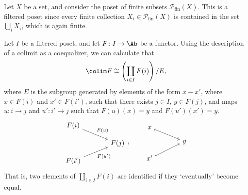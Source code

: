 \documentclass[main.tex]{subfiles}
\begin{document}
\begin{example}
  \label{eg:poset_of_finite_subsets}
  Let $X$ be a set, and consider the poset of finite subsets $\mathcal{P}_{\mathrm{fin}}(X)$. This is a filtered poset since every finite collection $X_{i} \in \mathcal{P}_{\mathrm{fin}}(X)$ is contained in the set $\bigcup_{i} X_{i}$, which is again finite.
\end{example}

Let $I$ be a filtered poset, and let $F\colon I \to \Ab$ be a functor. Using the description of a colimit as a coequalizer, we can calculate that
\begin{equation*}
  \colim F \cong \left( \coprod_{i \in I} F(i) \right) / E,
\end{equation*}
where $E$ is the subgroup generated by elements of the form $x - x'$, where $x \in F(i)$ and $x' \in F(i')$, such that there exists $j \in I$, $y \in F(j)$, and maps $u\colon i \to j$ and $u'\colon i' \to j$ such that $F(u)(x) = y$ and $F(u')(x') = y$.
\begin{equation*}
  \begin{tikzcd}[row sep=small, column sep=large]
    F(i)
    \arrow[dr, "F(u)"]
    \\
    & F(j)
    \\
    F(i')
    \arrow[ur, swap, "F(u')"]
  \end{tikzcd}
  ,\qquad
  \begin{tikzcd}[row sep=small, column sep=large]
    x
    \arrow[dr, mapsto]
    \\
    & y
    \\
    \arrow[ur, mapsto]
    x'
  \end{tikzcd}
\end{equation*}
That is, two elements of $\coprod_{i \in I} F(i)$ are identified if they `eventually' become equal.
\end{document}
